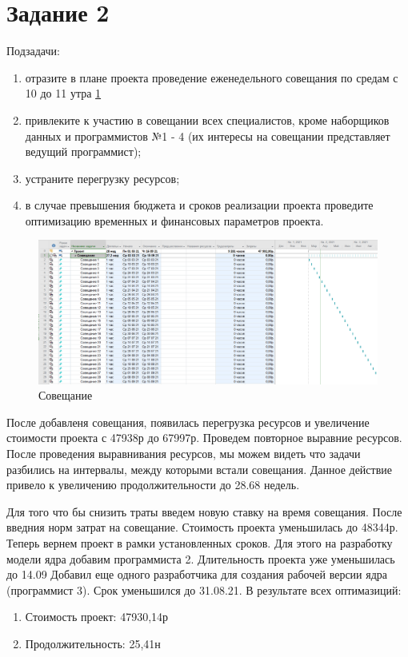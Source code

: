 \section{Задание 2}
Подзадачи:
\begin{enumerate}
	\item отразите в плане проекта проведение еженедельного совещания по
	средам с 10 до 11 утра \ref{fig:lab321}
	\item привлеките к участию в совещании всех специалистов, кроме
	наборщиков данных и программистов №1 - 4 (их интересы на совещании
	представляет ведущий программист);
	\item устраните перегрузку ресурсов;
	\item в случае превышения бюджета и сроков реализации проекта проведите
	оптимизацию временных и финансовых параметров проекта.
\end{enumerate}

\begin{figure}[h]
	\centering
	\includegraphics[width=0.7\linewidth]{src/lab3_2_1}
	\caption{Совещание}
	\label{fig:lab321}
\end{figure}

После добавленя совещания, появилась перегрузка ресурсов и увеличение стоимости проекта с 47938р до 67997р.
Проведем повторное выравние ресурсов.
После проведения выравнивания ресурсов, мы можем видеть что задачи разбились на интервалы, между которыми встали совещания.
Данное действие привело к увеличению продолжительности до 28.68 недель.

Для того что бы снизить траты введем новую ставку на время совещания.
После введния норм затрат на совещание. Стоимость проекта уменьшилась до 48344р.
Теперь вернем проект в рамки установленных сроков.
Для этого на разработку модели ядра добавим программиста 2. Длительность проекта уже уменьшилась до 14.09
Добавил еще одного разработчика для создания рабочей версии ядра (программист 3). Срок уменьшился до 31.08.21.
В результате всех оптимазиций:
\begin{enumerate}
	\item Стоимость проект: 47930,14р
	\item Продолжительность: 25,41н 
\end{enumerate}

















